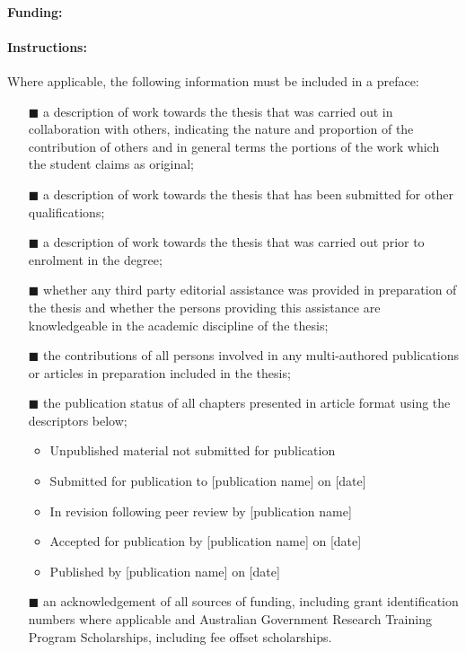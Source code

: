 {\paragraph{Funding:}  


\hrulefill

\paragraph{Instructions:}

Where applicable, the following information must be included in a preface:
\begin{itemize}
\item[\tiny{$\blacksquare$}] a description of work towards the thesis that was carried out in collaboration with others, indicating the nature and proportion of the contribution of others and in general terms the portions of the work which the student claims as original;
\item[\tiny{$\blacksquare$}] a description of work towards the thesis that has been submitted for other qualifications;
\item[\tiny{$\blacksquare$}] a description of work towards the thesis that was carried out prior to enrolment in the degree;
\item[\tiny{$\blacksquare$}] whether any third party editorial assistance was provided in preparation of
the thesis and whether the persons providing this assistance are knowledgeable in the academic discipline of the thesis;
\item[\tiny{$\blacksquare$}] the contributions of all persons involved in any multi-authored publications or
articles in preparation included in the thesis;
\item[\tiny{$\blacksquare$}] the publication status of all chapters presented in article format using the
descriptors below;
    \begin{itemize}
        \item Unpublished material not submitted for publication
        \item Submitted for publication to [publication name] on [date]
        \item In revision following peer review by [publication name]
        \item Accepted for publication by [publication name] on [date]
        \item Published by [publication name] on [date]
    \end{itemize}
\item[\tiny{$\blacksquare$}] an acknowledgement of all sources of funding, including grant identification
numbers where applicable and Australian Government Research Training Program Scholarships, including fee offset scholarships.
\end{itemize}



}
